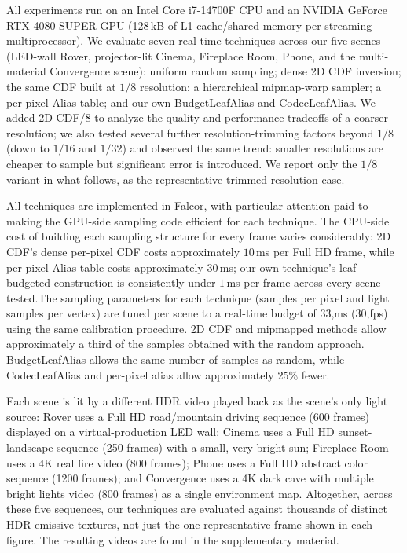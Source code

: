 \documentclass[acmtog,review,anonymous]{acmart}
\begin{document}
All experiments run on an Intel Core i7-14700F CPU and an NVIDIA GeForce RTX 4080 SUPER GPU (128\,kB of L1 cache/shared memory per streaming
multiprocessor). We evaluate seven real-time techniques across our five scenes
(LED-wall Rover, projector-lit Cinema, Fireplace Room, Phone, and the multi-material
Convergence scene): uniform random sampling; dense 2D CDF inversion; the same CDF built at $1/8$ resolution; a hierarchical
mipmap-warp sampler; a per-pixel Alias table; and our
own {BudgetLeafAlias} and {CodecLeafAlias}. We added 2D CDF/8 to analyze the quality and performance
tradeoffs of a coarser resolution; we also tested several further resolution-trimming factors beyond $1/8$ (down to $1/16$ and $1/32$)
and observed the same trend: smaller resolutions are cheaper to sample but significant error is introduced. We report only the $1/8$ variant in what follows, as the representative trimmed-resolution case.

All techniques are implemented in Falcor, with particular 
attention paid to making the GPU-side sampling code efficient for each technique. The CPU-side cost
of building each sampling structure for every frame varies considerably: 2D CDF's
dense per-pixel CDF costs approximately $10$\,ms per Full HD frame, while per-pixel Alias table costs approximately $30$\,ms; our own technique's
leaf-budgeted construction is consistently under $1$\,ms per frame across every scene tested.The sampling parameters for each technique (samples per pixel and light samples per vertex) are tuned per scene to a real-time budget of $33$,ms (30,fps) using the same calibration procedure. 2D CDF and mipmapped methods allow approximately a third of the samples obtained with the random approach. BudgetLeafAlias allows the same number of samples as random, while CodecLeafAlias and per-pixel alias allow approximately 25\% fewer.

Each scene is lit by a different HDR video played back as the
scene's only light source: Rover uses a Full HD road/mountain driving sequence
(600 frames) displayed on a virtual-production LED wall; Cinema uses a Full HD 
sunset-landscape sequence (250 frames) with a small, very bright sun; Fireplace Room uses a 4K real fire video (800 frames); Phone uses
a Full HD abstract color sequence (1200 frames); and
Convergence uses a 4K dark cave with multiple bright lights video (800 frames) as a single environment map. Altogether, across these five sequences, our techniques are evaluated against thousands of distinct HDR emissive
textures, not just the one representative frame shown in each figure. The resulting videos are found in the supplementary material.
\end{document}
